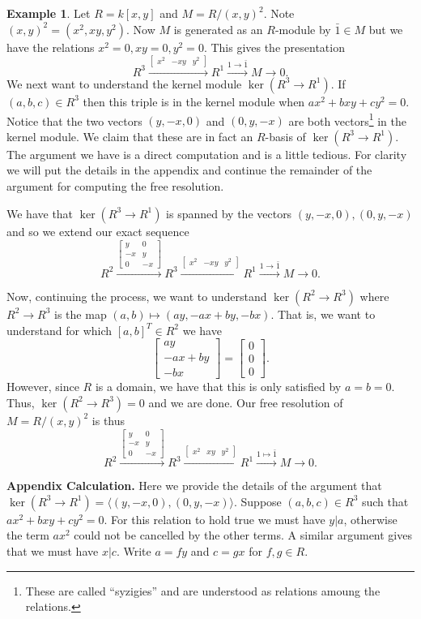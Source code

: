 \documentclass{article}
\theoremstyle{definition}
\newtheorem{example}[theorem]{Example}
\theoremstyle{remark}
\newcommand{\bmat}[1]{
    \begin{bmatrix*}
        #1
    \end{bmatrix*}
}
\begin{document}
\begin{example}
    Let $R = k[x,y]$ and $M = R/(x,y)^2$. Note $(x,y)^2 = (x^2, xy, y^2)$. 
    Now $M$ is generated as an $R$-module by $\bar 1 \in M$ but we have the relations
    $x^2 = 0 , xy = 0, y^2 = 0$. This gives the presentation
    \[
        R^3 \xrightarrow{\bmat{x^2 & -xy & y^2}} 
        R^1 \xrightarrow{1 \to \bar 1} 
        M \to 0.
    \]
    We next want to understand the kernel module $\ker(R^3 \to R^1)$.
    If $(a,b,c) \in R^3$ then this triple is in the kernel module when
    $ax^2 + bxy + cy^2 = 0$. 
    Notice that the two vectors $(y, -x, 0)$ and $(0, y, -x)$ are both
    vectors\footnote{
    These are called ``syzigies'' and are understood as relations amoung the
    relations. 
    }
    in the kernel module. We claim that these are in fact an $R$-basis of
    $\ker(R^3 \to R^1)$.
    The argument we have is a direct computation and is a little tedious. 
    For clarity we will put the details in the appendix and continue the
    remainder of the argument for computing the free resolution.

    We have that $\ker(R^3 \to R^1)$ is spanned by the vectors $(y,-x,0),
    (0,y,-x)$ and so we extend our exact sequence
    \[
        R^2 \xrightarrow{\bmat{y & 0 \\ -x & y \\ 0 & -x}}
        R^3 \xrightarrow{\bmat{x^2 & -xy & y^2}} 
        R^1 \xrightarrow{1 \to \bar 1} 
        M \to 0.
    \]

    Now, continuing the process, we want to understand 
    $\ker(R^2 \to R^3)$ where $R^2 \to R^3$ is the map 
    $(a,b) \mapsto (ay, -ax + by, -bx)$.
    That is, we want to understand for which $[a, b]^T \in R^2$ we have
    \[
        \bmat{ay \\ -ax + by \\ -bx} = \bmat{0 \\ 0 \\ 0}. 
    \]  
    However, since $R$ is a domain, we have that this is only satisfied by $a =
    b = 0$. Thus, $\ker(R^2 \to R^3) = 0$ and we are done. Our free resolution
    of $M = R/(x,y)^2$ 
    is thus
    \[
        R^2 \xrightarrow{\bmat{y & 0 \\ -x & y \\ 0 & -x}} 
        R^3 \xrightarrow{\bmat{x^2 & xy & y^2}}
        R^1 \xrightarrow{1 \mapsto \bar 1}
        M \to 0.
    \]

    \textbf{Appendix Calculation.}
    Here we provide the details of the argument that $\ker(R^3 \to R^1) =
    \langle(y,-x,0), (0,y,-x) \rangle$. 
    Suppose $(a,b,c) \in R^3$ such that $ax^2 + bxy + cy^2 = 0$. 
    For this relation to hold true we must have $y \vert a$, otherwise the term
    $ax^2$ could not be cancelled by the other terms. A similar argument gives
    that we must have $x \vert c$. Write $a = fy$ and $c = gx$ for $f,g \in R$.


\end{example}
\end{document}
